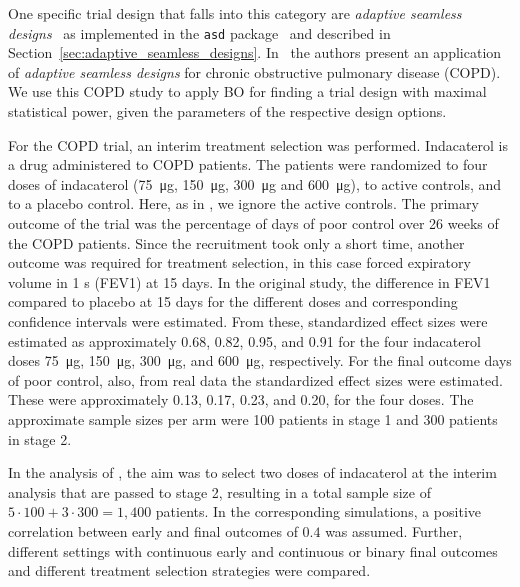 \documentclass[bimj,fleqn]{w-art}
\theoremstyle{plain}
\theoremstyle{definition}
\begin{document}
One specific trial design that falls into this category are \emph{adaptive seamless designs}~\citep{barnes_integrating_2010} as implemented in the \texttt{asd} package~\citep{parsons_software_2011}  and described in Section~\ref{sec:adaptive_seamless_designs}.
In~\citet{friede_adaptive_2020} the authors present an application of \emph{adaptive seamless designs} for chronic obstructive pulmonary disease (COPD).
We use this COPD study to apply BO for finding a trial design with maximal statistical power, given the parameters of the respective design options.


For the COPD trial, an interim treatment selection was performed. 
Indacaterol is a drug administered to COPD patients.
The patients were randomized to four doses of indacaterol (\SI{75}{\micro\gram}, \SI{150}{\micro\gram}, \SI{300}{\micro\gram} and \SI{600}{\micro\gram}), to active controls, and to a placebo control.
Here, as in \citet{friede_adaptive_2020}, we ignore the active controls.
The primary outcome of the trial was the percentage of days of poor control over 26 weeks of the COPD patients.
Since the recruitment took only a short time, another outcome was required for treatment selection, in this case forced expiratory volume in 1 s (FEV1) at 15 days.
In the original study, the difference in FEV1 compared to placebo at 15 days for the different doses and corresponding confidence intervals were estimated.
From these, standardized effect sizes were estimated as approximately 0.68, 0.82, 0.95, and 0.91 for the four  indacaterol doses \SI{75}{\micro\gram}, \SI{150}{\micro\gram}, \SI{300}{\micro\gram}, and \SI{600}{\micro\gram}, respectively.
For the final outcome days of poor control, also, from real data the standardized effect sizes were estimated.
These were approximately 0.13, 0.17, 0.23, and 0.20, for the four doses.
The approximate sample sizes per arm were 100 patients in stage 1 and 300 patients in stage 2.

In the analysis of \citet{friede_adaptive_2020}, the aim was to select two doses of indacaterol at the interim analysis that are passed to stage 2, resulting in a total sample size of $5 \cdot 100 + 3 \cdot 300 = 1,400$ patients. 
In the corresponding simulations, a positive correlation between early and final outcomes of $0.4$ was assumed.
Further, different settings with continuous early and continuous or binary final outcomes and different treatment selection strategies were compared.
\end{document}
